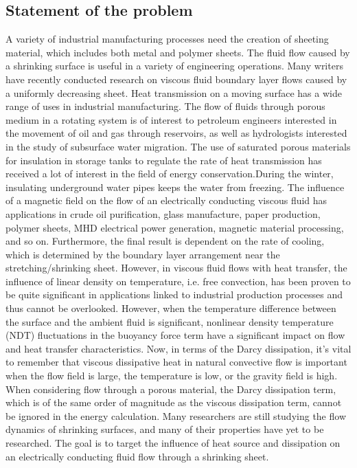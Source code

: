 \documentclass[a4paper,12pt]{report}
\begin{document}
{\subsection{Statement of the problem}
A variety of industrial manufacturing processes need the creation of sheeting material, which includes both metal and polymer sheets. The fluid flow caused by a shrinking surface is useful in a variety of engineering operations. Many writers have recently conducted research on viscous fluid boundary layer flows caused by a uniformly decreasing sheet. Heat transmission on a moving surface has a wide range of uses in industrial manufacturing. The flow of fluids through porous medium in a rotating system is of interest to petroleum engineers interested in the movement of oil and gas through reservoirs, as well as hydrologists interested in the study of subsurface water migration. The use of saturated porous materials for insulation in storage tanks to regulate the rate of heat transmission has received a lot of interest in the field of energy conservation.During the winter, insulating underground water pipes keeps the water from freezing. The influence of a magnetic field on the flow of an electrically conducting viscous fluid has applications in crude oil purification, glass manufacture, paper production, polymer sheets, MHD electrical power generation, magnetic material processing, and so on. Furthermore, the final result is dependent on the rate of cooling, which is determined by the boundary layer arrangement near the stretching/shrinking sheet. However, in viscous fluid flows with heat transfer, the influence of linear density on temperature, i.e. free convection, has been proven to be quite significant in applications linked to industrial production processes and thus cannot be overlooked. However, when the temperature difference between the surface and the ambient fluid is significant, nonlinear density temperature (NDT) fluctuations in the buoyancy force term have a significant impact on flow and heat transfer characteristics. Now, in terms of the Darcy dissipation, it's vital to remember that viscous dissipative heat in natural convective flow is important when the flow field is large, the temperature is low, or the gravity field is high. When considering flow through a porous material, the Darcy dissipation term, which is of the same order of magnitude as the viscous dissipation term, cannot be ignored in the energy calculation. Many researchers are still studying the flow dynamics of shrinking surfaces, and many of their properties have yet to be researched. The goal is to target the influence of heat source and dissipation on an electrically conducting fluid flow through a shrinking sheet.
}
\end{document}
